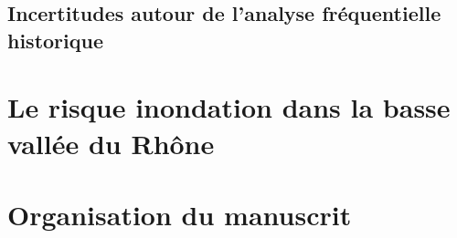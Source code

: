 \documentclass[11pt]{article}
\begin{document}
		\subsection{Incertitudes autour de l'analyse fréquentielle historique}
		
\section{Le risque inondation dans la basse vallée  du Rhône}

\section{Organisation du manuscrit}






\printbibliography
\end{document}
